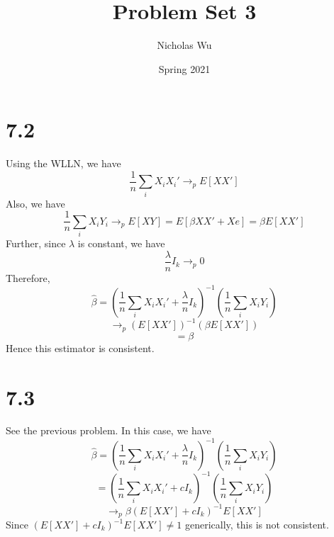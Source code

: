\documentclass[10pt,letter]{article}
\begin{document}


\title{Problem Set 3}

\author{Nicholas Wu}

\date{Spring 2021}

\maketitle


\section*{7.2}
Using the WLLN, we have
\[ \frac{1}{n}\sum_{i} X_i X_i' \to_p E[XX'] \]
Also, we have
\[ \frac{1}{n}\sum_i X_i Y_i \to_p E[XY] = E[\beta XX' + Xe] = \beta E[XX'] \]
Further, since $\lambda$ is constant, we have
\[ \frac{\lambda}{n} I_k \to_p 0 \]
Therefore,
\[ \hat{\beta} = \left(\frac{1}{n}\sum_{i} X_i X_i' + \frac{\lambda}{n} I_k \right)^{-1}\left(\frac{1}{n}\sum_i X_i Y_i \right) \]
\[ \to_p (E[XX'])^{-1}(\beta E[XX']) \]
\[ = \beta \]
Hence this estimator is consistent.
\section*{7.3}
See the previous problem. In this case, we have
\[ \hat{\beta} = \left(\frac{1}{n}\sum_{i} X_i X_i' + \frac{\lambda}{n} I_k \right)^{-1}\left(\frac{1}{n}\sum_i X_i Y_i \right) \]
\[ = \left(\frac{1}{n}\sum_{i} X_i X_i' + c I_k \right)^{-1}\left(\frac{1}{n}\sum_i X_i Y_i \right) \]
\[ \to_p \beta (E[XX'] + cI_k)^{-1}E[XX'] \]
Since $(E[XX'] + cI_k)^{-1}E[XX'] \neq 1$ generically, this is not consistent.
\end{document}
